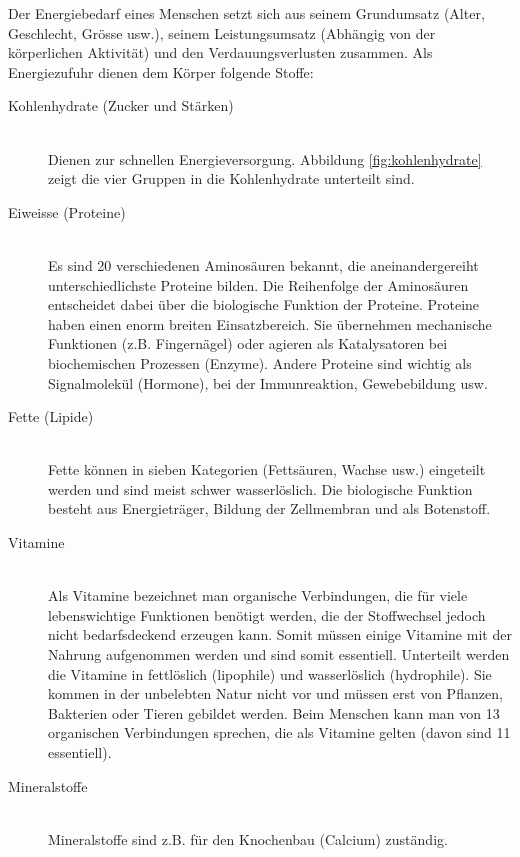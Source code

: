 Der Energiebedarf eines Menschen setzt sich aus seinem Grundumsatz (Alter, Geschlecht, Grösse usw.), seinem Leistungsumsatz (Abhängig von der körperlichen Aktivität) und den Verdauungsverlusten zusammen. Als Energiezufuhr dienen dem Körper folgende Stoffe:
\begin{description}
	\item[Kohlenhydrate (Zucker und Stärken)] \hfil \\
	Dienen zur schnellen Energieversorgung. Abbildung \ref{fig:kohlenhydrate} zeigt die vier Gruppen in die Kohlenhydrate unterteilt sind.
	
	\item[Eiweisse (Proteine)] \hfil \\
	Es sind 20 verschiedenen Aminosäuren bekannt, die 	aneinandergereiht unterschiedlichste Proteine bilden. Die Reihenfolge	der Aminosäuren entscheidet dabei über die biologische Funktion der Proteine.	Proteine haben einen enorm breiten Einsatzbereich. Sie übernehmen mechanische Funktionen (z.B. Fingernägel)	oder agieren als Katalysatoren bei biochemischen Prozessen (Enzyme). Andere Proteine sind wichtig als Signalmolekül (Hormone), bei der Immunreaktion, Gewebebildung usw.
	
	\item[Fette (Lipide)] \hfil \\
	Fette können in sieben Kategorien (Fettsäuren, Wachse usw.) eingeteilt werden und sind meist schwer wasserlöslich. Die biologische Funktion besteht	aus Energieträger, Bildung der Zellmembran und als Botenstoff.
	
	\item[Vitamine] \hfil \\
	Als Vitamine bezeichnet man organische Verbindungen, die für viele lebenswichtige Funktionen benötigt werden, die der Stoffwechsel jedoch nicht bedarfsdeckend erzeugen kann. Somit müssen einige Vitamine mit der Nahrung aufgenommen werden und sind somit essentiell. Unterteilt werden die Vitamine in fettlöslich (lipophile)	und wasserlöslich (hydrophile). Sie kommen in der unbelebten Natur nicht vor und	müssen erst von Pflanzen, Bakterien oder Tieren gebildet werden. Beim Menschen kann man von 13 organischen	Verbindungen sprechen, die als Vitamine gelten (davon sind 11 essentiell).
	
	\item[Mineralstoffe] \hfil \\
	Mineralstoffe sind z.B. für den Knochenbau (Calcium) zuständig.
\end{description}

